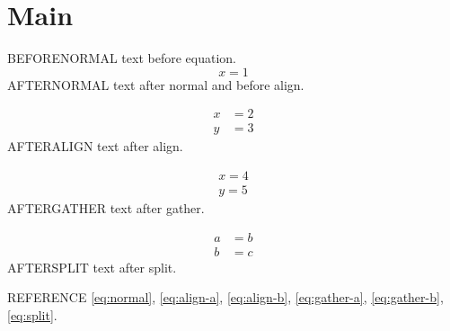 \documentclass{article}
\numberwithin{equation}{section}
\begin{document}
\section{Main}
BEFORENORMAL text before equation.
\begin{equation}\label{eq:normal}x=1\end{equation}
AFTERNORMAL text after normal and before align.

\begin{align}x&=2\label{eq:align-a}\\y&=3\label{eq:align-b}\end{align}
AFTERALIGN text after align.

\begin{gather}x=4\label{eq:gather-a}\\y=5\label{eq:gather-b}\end{gather}
AFTERGATHER text after gather.

\begin{equation}\begin{split}a&=b\\b&=c\end{split}\label{eq:split}\end{equation}
AFTERSPLIT text after split.

\clearpage
REFERENCE \eqref{eq:normal}, \eqref{eq:align-a}, \eqref{eq:align-b},
\eqref{eq:gather-a}, \eqref{eq:gather-b}, \eqref{eq:split}.
\end{document}
